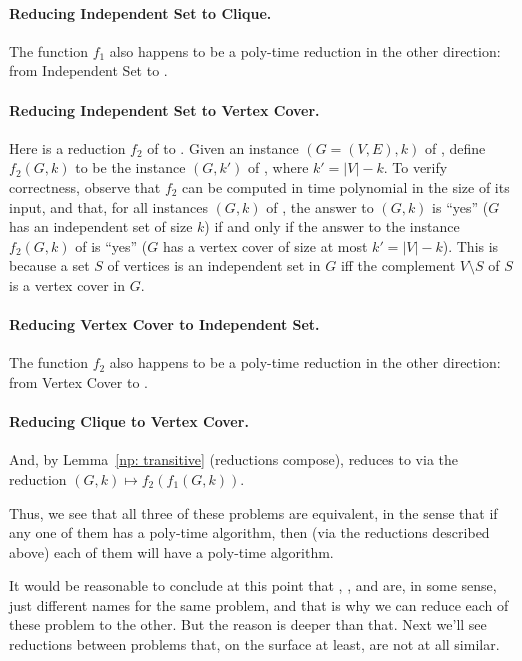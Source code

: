 \documentclass[11pt]{article}
\begin{document}
\paragraph{Reducing Independent Set to Clique.}
The function $f_1$ also happens to be a poly-time reduction in the other direction:
from {\sc Independent Set} to .

\paragraph{Reducing Independent Set to Vertex Cover.} 
Here is a reduction $f_2$ of  to .
Given an instance $(G=(V,E), k)$ of ,
define $f_2(G,k)$ to be the instance $(G, k')$ of , where $k' = |V|-k$.
To verify correctness, observe that $f_2$ can be computed in time polynomial in the size of its input,
and that, for all instances $(G,k)$ of ,
the answer to $(G,k)$ is ``yes''
($G$ has an independent set of size $k$)
if and only if
the answer to the instance $f_2(G,k)$ of  is ``yes''
($G$ has a vertex cover of size at most $k'=|V|-k$).
This is because a set $S$ of vertices is an independent set in $G$
iff the complement $V\setminus S$ of $S$ is a vertex cover in $G$.

\paragraph{Reducing Vertex Cover to Independent Set.}  
The function $f_2$ also happens to be a poly-time reduction in the other direction:
from {\sc Vertex Cover} to .

\paragraph{Reducing Clique to Vertex Cover.} 
And, by Lemma~\ref{np: transitive} (reductions compose),
 reduces to  via
the reduction $(G,k) \mapsto f_2(f_1(G,k))$.

\medskip

Thus, we see that all three of these problems are equivalent, in the sense that
if any one of them has a poly-time algorithm, 
then (via the reductions described above)
each of them will have a poly-time algorithm.

It would be reasonable to conclude at this point
that , ,
and  are, in some sense,
just different names for the same problem,
and that is why we can reduce each of these problem to the other.
But the reason is deeper than that.
Next we'll see reductions between problems that, on the surface at least,
are not at all similar.
\end{document}
